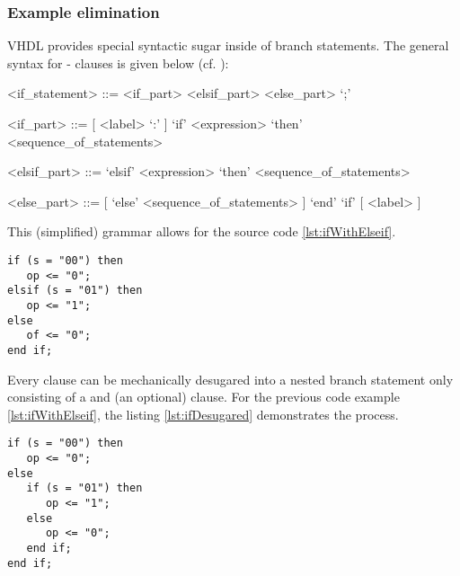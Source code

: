 \subsubsection{Example elimination}
VHDL provides special syntactic sugar inside of branch statements.
The general syntax for - clauses is given below (cf. \cite{IEEELRM}):
%
\begin{grammar}
<if_statement> ::= <if_part> <elsif_part> <else_part> `;'

<if_part> ::= [ <label> `:' ] `if' <expression> `then' <sequence_of_statements>

<elsif_part> ::= { `elsif' <expression> `then' <sequence_of_statements> }

<else_part> ::= [ `else' <sequence_of_statements> ] `end' `if' [ <label> ]
\end{grammar}
%
This (simplified) grammar allows for the source code
\ref{lst:ifWithElseif}.
%
\begin{lstlisting}[style=vhdl,caption={Original if statement with
      elsif},label={lst:ifWithElseif}]
if (s = "00") then
   op <= "0";
elsif (s = "01") then
   op <= "1";
else
   of <= "0";
end if;
\end{lstlisting}
%
Every  clause can be mechanically
desugared into a nested branch statement only consisting of a 
and (an optional)  clause. For the previous code example
\ref{lst:ifWithElseif},
the listing \ref{lst:ifDesugared} demonstrates the process.
%
\begin{lstlisting}[style=vhdl,caption={Desugared if
      statement},label={lst:ifDesugared}]
if (s = "00") then
   op <= "0";
else
   if (s = "01") then
      op <= "1";
   else
      op <= "0";
   end if;
end if;
\end{lstlisting}
%

